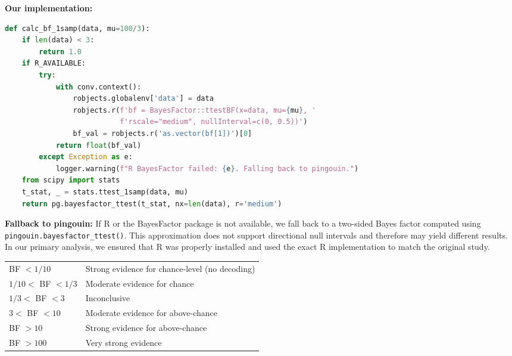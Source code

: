 \documentclass[11pt,a4paper]{article}
\begin{document}
\textbf{Our implementation:}
\begin{lstlisting}[style=pythonstyle,language=Python]
def calc_bf_1samp(data, mu=100/3):
    if len(data) < 3:
        return 1.0
    if R_AVAILABLE:
        try:
            with conv.context():
                robjects.globalenv['data'] = data
                robjects.r(f'bf = BayesFactor::ttestBF(x=data, mu={mu}, '
                           f'rscale="medium", nullInterval=c(0, 0.5))')
                bf_val = robjects.r('as.vector(bf[1])')[0]
            return float(bf_val)
        except Exception as e:
            logger.warning(f"R BayesFactor failed: {e}. Falling back to pingouin.")
    from scipy import stats
    t_stat, _ = stats.ttest_1samp(data, mu)
    return pg.bayesfactor_ttest(t_stat, nx=len(data), r='medium')
\end{lstlisting}

\textbf{Fallback to pingouin:} If R or the BayesFactor package is not available, we fall back to a two-sided Bayes factor computed using \texttt{pingouin.bayesfactor\_ttest()}. This approximation does not support directional null intervals and therefore may yield different results. In our primary analysis, we ensured that R was properly installed and used the exact R implementation to match the original study.

\begin{tcolorbox}[
  enhanced,
  colback=softgray,
  colframe=medblue,
  boxrule=0.5pt,
  arc=2pt,
  left=10pt, right=10pt, top=6pt, bottom=6pt,
  title={\sffamily\small Bayes Factor Interpretation Guide},
  coltitle=white,
  colbacktitle=medblue,
  fonttitle=\sffamily\bfseries\small
]
\small
\begin{tabular}{@{} >{\raggedright}p{3.5cm} l @{}}
BF $< 1/10$ & Strong evidence for chance-level (no decoding) \\
$1/10 <$ BF $< 1/3$ & Moderate evidence for chance \\
$1/3 <$ BF $< 3$ & Inconclusive \\
$3 <$ BF $< 10$ & Moderate evidence for above-chance \\
BF $> 10$ & Strong evidence for above-chance \\
BF $> 100$ & Very strong evidence \\
\end{tabular}
\end{tcolorbox}

\end{document}
